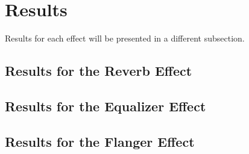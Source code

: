 \section{Results}

Results for each effect will be presented in a different subsection. 

\subsection{Results for the Reverb Effect}






\subsection{Results for the Equalizer Effect}


\subsection{Results for the Flanger Effect}